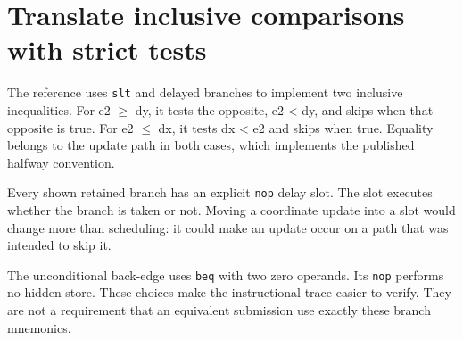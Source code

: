 \section{Translate inclusive comparisons with strict
  tests}\label{007-bresenham-line-p08-translate-inclusive-comparisons-with-strict-tests}

The reference uses \texttt{slt} and delayed branches to implement two
inclusive inequalities. For e2 \ensuremath{\geq} dy, it tests the opposite, e2
\textless{} dy, and skips when that opposite is true. For e2 \ensuremath{\leq} dx, it
tests dx \textless{} e2 and skips when true. Equality belongs to the
update path in both cases, which implements the published halfway
convention.

Every shown retained branch has an explicit \texttt{nop} delay slot. The
slot executes whether the branch is taken or not. Moving a coordinate
update into a slot would change more than scheduling: it could make an
update occur on a path that was intended to skip it.

The unconditional back-edge uses \texttt{beq} with two zero operands.
Its \texttt{nop} performs no hidden store. These choices make the
instructional trace easier to verify. They are not a requirement that an
equivalent submission use exactly these branch mnemonics.
